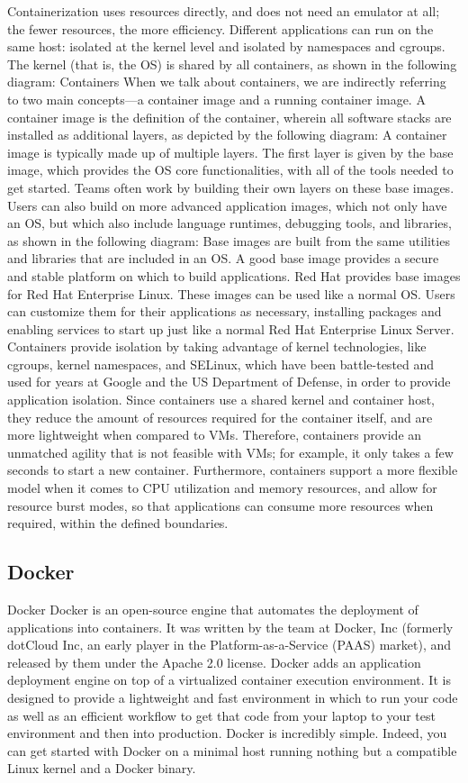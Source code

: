 Containerization uses resources directly, and does not need an emulator at all; the fewer
resources, the more efficiency. Different applications can run on the same host: isolated at
the kernel level and isolated by namespaces and cgroups. The kernel (that is, the OS) is
shared by all containers, as shown in the following diagram:
Containers
When we talk about containers, we are indirectly referring to two main concepts—a
container image and a running container image.
A container image is the definition of the container, wherein all software stacks are
installed as additional layers, as depicted by the following diagram:
A container image is typically made up of multiple layers.
The first layer is given by the base image, which provides the OS core functionalities, with
all of the tools needed to get started. Teams often work by building their own layers on
these base images. Users can also build on more advanced application images, which not
only have an OS, but which also include language runtimes, debugging tools, and libraries,
as shown in the following diagram:
Base images are built from the same utilities and libraries that are included in an OS. A
good base image provides a secure and stable platform on which to build applications. Red
Hat provides base images for Red Hat Enterprise Linux. These images can be used like a
normal OS. Users can customize them for their applications as necessary, installing
packages and enabling services to start up just like a normal Red Hat Enterprise Linux
Server.
Containers provide isolation by taking advantage of kernel technologies, like cgroups,
kernel namespaces, and SELinux, which have been battle-tested and used for years at
Google and the US Department of Defense, in order to provide application isolation.
Since containers use a shared kernel and container host, they reduce the amount of
resources required for the container itself, and are more lightweight when compared to
VMs. Therefore, containers provide an unmatched agility that is not feasible with VMs; for
example, it only takes a few seconds to start a new container. Furthermore, containers
support a more flexible model when it comes to CPU utilization and memory resources,
and allow for resource burst modes, so that applications can consume more resources when
required, within the defined boundaries.

\subsection{Docker}
Docker
Docker is an open-source engine that automates the deployment of
applications into containers. It was written by the team at Docker, Inc
(formerly dotCloud Inc, an early player in the Platform-as-a-Service
(PAAS) market), and released by them under the Apache 2.0 license.
Docker adds an application deployment
engine on top of a virtualized container execution environment. It is
designed to provide a lightweight and fast environment in which to run your
code as well as an efficient workflow to get that code from your laptop to
your test environment and then into production. Docker is incredibly
simple. Indeed, you can get started with Docker on a minimal host running
nothing but a compatible Linux kernel and a Docker binary. 

